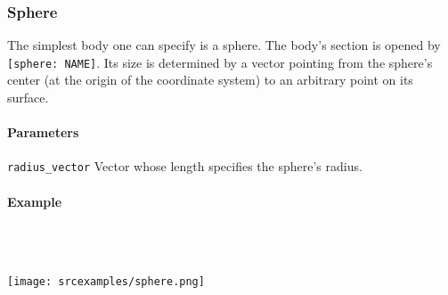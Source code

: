 \subsubsection{Sphere}
The simplest body one can specify is a sphere. The body's section is opened by \lstinline{[sphere: NAME]}. Its size is determined by a  vector pointing from the sphere's center (at the origin of the coordinate system) to an arbitrary point on its surface.

\paragraph{Parameters}
\begin{description}
 \item{\lstinline{radius_vector}} Vector whose length specifies the sphere's radius.
\end{description}

\paragraph{Example}\ 


\ \\\texttt{[image: srcexamples/sphere.png]}